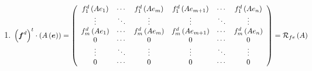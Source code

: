 \documentclass[aps,preprint]{revtex4}%
\begin{document}
\begin{enumerate}
\begin{enumerate}
\begin{enumerate}
\item
\begin{equation}
\left(  \boldsymbol{f}^{d}\right)  ^{t}\cdot\left(  A\left(  \boldsymbol{e}%
\right)  \right)  =\left(
\begin{array}
[c]{cccccc}%
f_{1}^{d}\left(  Ae_{1}\right)  & \cdots & f_{1}^{d}\left(  Ae_{m}\right)  &
f_{1}^{d}\left(  Ae_{m+1}\right)  & \cdots & f_{1}^{d}\left(  Ae_{n}\right) \\
\vdots & \ddots & \vdots & \vdots & \ddots & \vdots\\
f_{m}^{d}\left(  Ae_{1}\right)  & \cdots & f_{m}^{d}\left(  Ae_{m}\right)  &
f_{m}^{d}\left(  Ae_{m+1}\right)  & \cdots & f_{m}^{d}\left(  Ae_{n}\right) \\
0 & \cdots & 0 & 0 & \cdots & 0\\
\vdots & \ddots & \vdots & \vdots & \ddots & \vdots\\
0 & \cdots & 0 & 0 & \cdots & 0
\end{array}
\right)  =\mathcal{R}_{fe}\left(  A\right)
\end{equation}



\end{enumerate}
\end{enumerate}
\end{enumerate}
\end{document}
